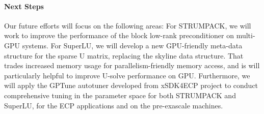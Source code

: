 
\vspace{-.135in}
\paragraph{Next Steps} Our future efforts will focus on the following areas:
 For STRUMPACK, we will work to improve the performance of the block
 low-rank preconditioner on multi-GPU systems.
 For SuperLU, we will develop a new GPU-friendly meta-data structure for the sparse U matrix,
 replacing the skyline data structure. That trades increased memory usage for
 parallelism-friendly memory access, and is will particularly helpful to improve
 U-solve performance on GPU.
 Furthermore, we will apply the GPTune autotuner developed from xSDK4ECP project to conduct comprehensive
 tuning in the parameter space for both STRUMPACK and SuperLU, for the ECP applications and
 on the pre-exascale machines.


